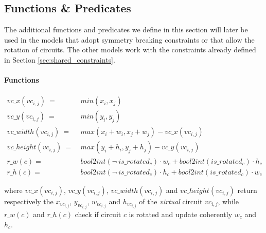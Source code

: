 
\subsection{Functions \& Predicates} \label{sec:CP_functions_predicates}
The additional functions and predicates we define in this section will later be used in the models
that adopt symmetry breaking constraints or that allow the rotation of circuits. The other models
work with the constraints already defined in Section \ref{sec:shared_constraints}.

\paragraph{Functions}
\begin{align}
  vc\_x(vc_{i,j})\        =\  & min(x_i, x_j)                                                     \nonumber \\
  vc\_y(vc_{i,j})\        =\  & min(y_i, y_j)                                                     \nonumber \\
  vc\_width(vc_{i,j})\    =\  & max(x_i + w_i, x_j + w_j) - vc\_x(vc_{i,j})                       \nonumber \\
  vc\_height(vc_{i,j})\   =\  & max(y_i + h_i, y_j + h_j) - vc\_y(vc_{i,j})                       \nonumber \\
  r\_w(c) =\                  & bool2int(\neg\ is\_rotated_c) \cdot w_c + bool2int(is\_rotated_c) \cdot h_c
  \label{eq:CP_r_w}                                                                                         \\
  r\_h(c) =\                  & bool2int(\neg\ is\_rotated_c) \cdot h_c + bool2int(is\_rotated_c) \cdot w_c
  \label{eq:CP_r_h}
\end{align}

where $vc\_x(vc_{i,j})$, $vc\_y(vc_{i,j})$, $vc\_width(vc_{i,j})$ and $vc\_height(vc_{i,j})$
return respectively the $x_{vc_{i,j}}$, $y_{vc_{i,j}}$, $w_{vc_{i,j}}$ and $h_{vc_{i,j}}$ of 
the \textit{virtual} circuit $vc_{i,j}$, while $r\_w(c)$ and $r\_h(c)$ check if circuit $c$ 
is rotated and update coherently $w_c$ and $h_c$.

